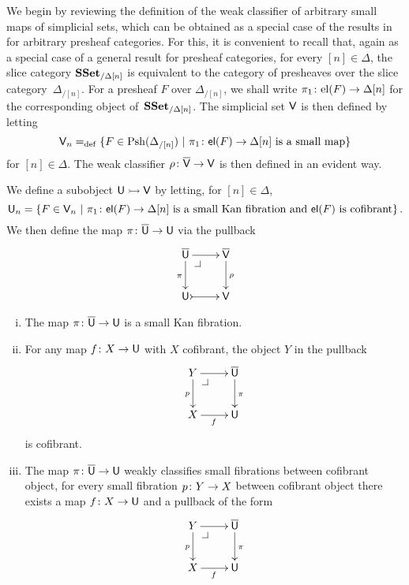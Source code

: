 \documentclass[reqno,10pt,a4paper,oneside,draft]{amsart}
\begin{document}
We begin by reviewing the definition of the weak classifier of arbitrary small maps of simplicial sets, which
can be obtained as a special case of the results in~\cite{hofmann-streicher-universes} for arbitrary presheaf
categories. For this, it is convenient to recall that, again as a special case of a general result for presheaf categories, for every $[n] \in \Delta$, the slice category $\mathbf{SSet}_{/\Delta[n]}$ is equivalent to the category of presheaves over the slice category~$\Delta_{/[n]}$. For a presheaf $F$ over $\Delta_{/[n]}$, we shall write $\pi_1 \colon \mathrm{el}(F) \to \Delta[n]$
for the corresponding object of~$\mathbf{SSet}_{/\Delta[n]}$. The simplicial set $\mathsf{V}$ is then defined by letting
\[
\mathsf{V}_n =_{\operatorname{def}} \{ F \in \mathrm{Psh}(\Delta_{/[n]}) \ | \ \pi_1 \colon \mathsf{el}(F) \to \Delta[n] \text{ is a small
map} \}
\]
for $[n] \in \Delta$. The weak classifier $\rho \colon \overline{\mathsf{V}} \to \mathsf{V}$ is then defined in an evident way. 

\medskip

We define a subobject $\mathsf{U} \rightarrowtail \mathsf{V}$ by letting, for $[n] \in \Delta$, 
\[
\mathsf{U}_n = \{ F \in \mathsf{V}_n \ | \ \pi_1 \colon \mathsf{el}(F) \to \Delta[n] \text{ is a small Kan fibration and $\mathsf{el}(F)$ is cofibrant} \} \, .
\]
We then define the map $\pi \colon \overline{\mathsf{U}} \to \mathsf{U}$ via the pullback 
\[
\xymatrix{
\UU \ar[r] \ar[d]_\pi \drpullback  & \VV \ar[d]^\rho \\
\U \ar@{>->}[r] & \V }
\]




\begin{proposition} \label{thm:universe-u}  \hfill 
\begin{enumerate}[(i)] 
\item The map $\pi \colon \overline{\mathsf{U}} \to \mathsf{U}$ is a small Kan fibration.
\item For any map $f \colon X \rightarrow \mathsf{U}$ with $X$ cofibrant, the object $Y$ in the pullback
\[
\xymatrix{
Y \ar[r] \ar[d]_p \drpullback & \UU \ar[d]^\pi \\
X \ar[r]_f & \U }
\]
is cofibrant.
\item The map $\pi \colon \overline{\mathsf{U}} \to \mathsf{U}$ weakly classifies small fibrations between cofibrant object, \ie 
for every small fibration $p \colon Y \to X$ between cofibrant object there exists a map $f \colon X \to \mathsf{U}$
and a pullback  of the form
\[
\xymatrix{
Y \ar[r] \ar[d]_p \drpullback & \UU \ar[d]^\pi \\
X \ar[r]_f & \U }
\]
\end{enumerate}
\end{proposition}
\end{document}
